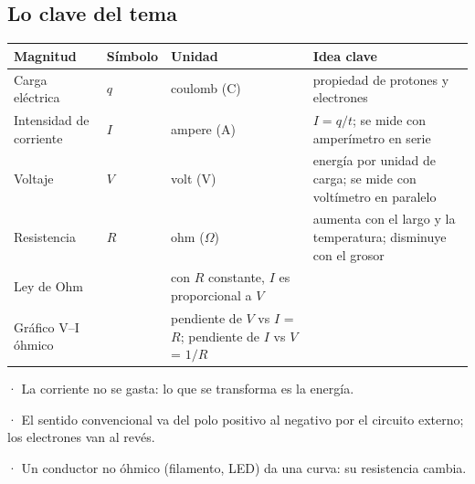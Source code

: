\subsection{Lo clave del tema}
\begin{center}\small
\begin{tabularx}{\linewidth}{@{}>{\raggedright\arraybackslash\hsize=1.10\hsize}X>{\raggedright\arraybackslash\hsize=0.48\hsize}X>{\raggedright\arraybackslash\hsize=0.52\hsize}X>{\raggedright\arraybackslash\hsize=1.90\hsize}X@{}}
\toprule
\textbf{Magnitud} & \textbf{Símbolo} & \textbf{Unidad} & \textbf{Idea clave} \\
\midrule
Carga eléctrica & $q$ & coulomb (C) & propiedad de protones y electrones \\
Intensidad de corriente & $I$ & ampere (A) & $I = q/t$; se mide con amperímetro en serie \\
Voltaje & $V$ & volt (V) & energía por unidad de carga; se mide con voltímetro en paralelo \\
Resistencia & $R$ & ohm (\ensuremath{\Omega}) & aumenta con el largo y la temperatura; disminuye con el grosor \\
Ley de Ohm & \multicolumn{2}{@{}l@{}}{$V = I\cdot R$} & con $R$ constante, $I$ es proporcional a $V$ \\
Gráfico V--I óhmico & \multicolumn{2}{@{}l@{}}{recta por el origen} & pendiente de $V$ vs $I$ = $R$; pendiente de $I$ vs $V$ = $1/R$ \\
\bottomrule
\end{tabularx}
\end{center}
 
\begin{clave}[{Recuerda}] · La corriente no se gasta: lo que se transforma es la energía.\par · El sentido convencional va del polo positivo al negativo por el circuito externo; los electrones van al revés.\par · Un conductor no óhmico (filamento, LED) da una curva: su resistencia cambia.\end{clave}
 
